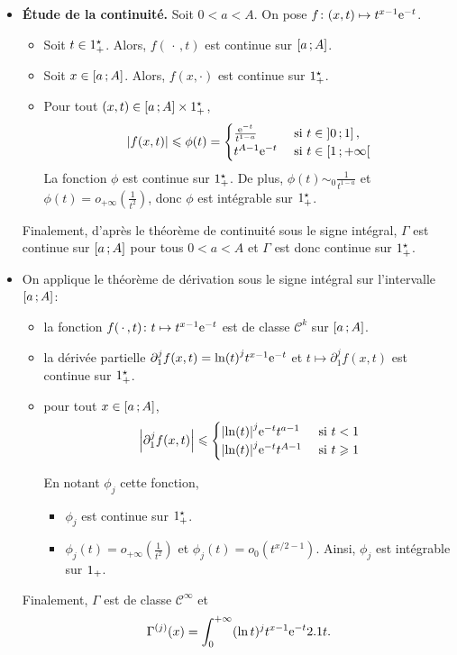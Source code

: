 \begin{demo}
\begin{itemize}
\item \textbf{Étude de la continuité.} Soit $0 < a < A$. On pose $\fonctionligne[f]{(x, t)}{t^{x-1} \e^{-t}}$.
\begin{itemize}
\item Soit $t \in \Rpe$. Alors, $f(\,\cdot\,, t)$ est continue sur $\interff{a}{A}$.

\item Soit $x \in \interff{a}{A}$. Alors, $f(x, \cdot)$ est continue sur $\Rpe$.

\item Pour tout $(x, t) \in \interff{a}{A} \times \Rpe$,
\[
\abs{f(x, t)} \leqslant \phi(t) = 
\begin{cases}
\frac{\e^{-t}}{t^{1-a}} &\text{ si } t \in \interof{0}{1},\\
t^{A-1} \e^{-t} &\text{ si } t \in \interfo{1}{+\infty}
\end{cases}
\]
La fonction $\phi$ est continue sur $\Rpe$. De plus, $\phi(t) \sim_0 \frac{1}{t^{1 - a}}$ et $\phi(t) = o_{+\infty}\mathopen{}\left(\frac{1}{t^2}\right)$, donc $\phi$ est intégrable sur $\Rpe$.
\end{itemize}
Finalement, d'après le théorème de continuité sous le signe intégral, $\Gamma$ est continue sur $\interff{a}{A}$ pour tous $0 < a < A$ et $\Gamma$ est donc continue sur $\Rpe$.

\item On applique le théorème de dérivation sous le signe intégral sur l'intervalle $\interff{a}{A}$:
\begin{itemize}
\item la fonction $\fonctionligne[f(\,\cdot\,, t)]{t}{t^{x - 1} \e^{-t}}$ est de classe $\mathscr{C}^k$ sur $\interff{a}{A}$.

\item la dérivée partielle $\partial_1^j f(x, t) = \ln(t)^j t^{x - 1} \e^{-t}$ et $t \mapsto \partial_1^j f(x, t)$ est continue sur $\Rpe$.

\item pour tout $x \in \interff{a}{A}$,
\[
\abs{\partial_1^j f(x, t)} \leqslant
\begin{cases}
\abs{\ln(t)}^j \e^{-t} t^{a-1} &\text{ si } t < 1 \\
\abs{\ln(t)}^j \e^{-t} t^{A-1} &\text{ si } t \geqslant 1
\end{cases}
\]

En notant $\phi_j$ cette fonction,
\begin{itemize}
\item $\phi_j$ est continue sur $\Rpe$.
\item $\phi_j(t) = o_{+\infty}\mathopen{}\left(\frac{1}{t^2}\right)$ et $\phi_j(t) = o_0(t^{x/2-1})$. Ainsi, $\phi_j$ est intégrable sur $\Rp$.
\end{itemize}
\end{itemize}
Finalement, $\Gamma$ est de classe $\mathscr{C}^\infty$ et
\[
\Gamma^{(j)}(x) = \int_0^{+\infty} (\ln t)^j t^{x-1} \e^{-t} \d t.
\]
\end{itemize}
\end{demo}

